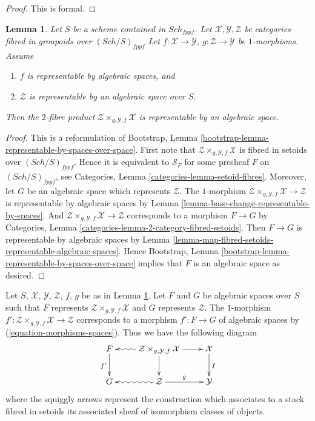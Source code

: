 \documentclass{stacks-project}
\theoremstyle{plain}
\newtheorem{lemma}[subsection]{Lemma}
\theoremstyle{definition}
\theoremstyle{remark}
\numberwithin{equation}{subsection}
\def\Sch{\mathit{Sch}}
\begin{document}
\begin{proof}
This is formal.
\end{proof}

\begin{lemma}
\label{lemma-base-change-by-space-representable-by-space}
Let $S$ be a scheme contained in $\Sch_{fppf}$.
Let $\mathcal{X}, \mathcal{Y}, \mathcal{Z}$
be categories fibred in groupoids over $(\Sch/S)_{fppf}$
Let $f : \mathcal{X} \to \mathcal{Y}$,
$g : \mathcal{Z} \to \mathcal{Y}$ be $1$-morphisms.
Assume
\begin{enumerate}
\item $f$ is representable by algebraic spaces, and
\item $\mathcal{Z}$ is representable by an algebraic space over $S$.
\end{enumerate}
Then the $2$-fibre product
$\mathcal{Z} \times_{g, \mathcal{Y}, f} \mathcal{X}$
is representable by an algebraic space.
\end{lemma}

\begin{proof}
This is a reformulation of
Bootstrap, Lemma \ref{bootstrap-lemma-representable-by-spaces-over-space}.
First note that
$\mathcal{Z} \times_{g, \mathcal{Y}, f} \mathcal{X}$
is fibred in setoids over $(\Sch/S)_{fppf}$.
Hence it is equivalent to $\mathcal{S}_F$ for some presheaf
$F$ on $(\Sch/S)_{fppf}$, see
Categories, Lemma \ref{categories-lemma-setoid-fibres}.
Moreover, let $G$ be an algebraic space which represents
$\mathcal{Z}$. The $1$-morphism
$\mathcal{Z} \times_{g, \mathcal{Y}, f} \mathcal{X} \to \mathcal{Z}$
is representable by algebraic spaces by
Lemma \ref{lemma-base-change-representable-by-spaces}.
And $\mathcal{Z} \times_{g, \mathcal{Y}, f} \mathcal{X} \to \mathcal{Z}$
corresponds to a morphism $F \to G$ by
Categories, Lemma \ref{categories-lemma-2-category-fibred-setoids}.
Then $F \to G$ is representable by algebraic spaces by
Lemma \ref{lemma-map-fibred-setoids-representable-algebraic-spaces}.
Hence
Bootstrap, Lemma \ref{bootstrap-lemma-representable-by-spaces-over-space}
implies that $F$ is an algebraic space as desired.
\end{proof}

\noindent
Let $S$, $\mathcal{X}$, $\mathcal{Y}$, $\mathcal{Z}$, $f$, $g$ be as in
Lemma \ref{lemma-base-change-by-space-representable-by-space}.
Let $F$ and $G$ be algebraic spaces over $S$ such that
$F$ represents $\mathcal{Z} \times_{g, \mathcal{Y}, f} \mathcal{X}$
and $G$ represents $\mathcal{Z}$. The $1$-morphism
$f' : \mathcal{Z} \times_{g, \mathcal{Y}, f} \mathcal{X} \to \mathcal{Z}$
corresponds to a morphism $f' : F \to G$ of algebraic spaces
by (\ref{equation-morphisms-spaces}).
Thus we have the following diagram
\begin{equation}
\label{equation-representable-by-algebraic-spaces-on-space}
\vcenter{
\xymatrix{
F \ar[d]_{f'} &
\mathcal{Z} \times_{g, \mathcal{Y}, f} \mathcal{X}
\ar@{~>}[l] \ar[d] \ar[r] &
\mathcal{X} \ar[d]^f \\
G &
\mathcal{Z} \ar@{~>}[l] \ar[r]^-g &
\mathcal{Y}
}
}
\end{equation}
where the squiggly arrows represent the construction which associates
to a stack fibred in setoids its associated sheaf of isomorphism classes
of objects.
\end{document}
